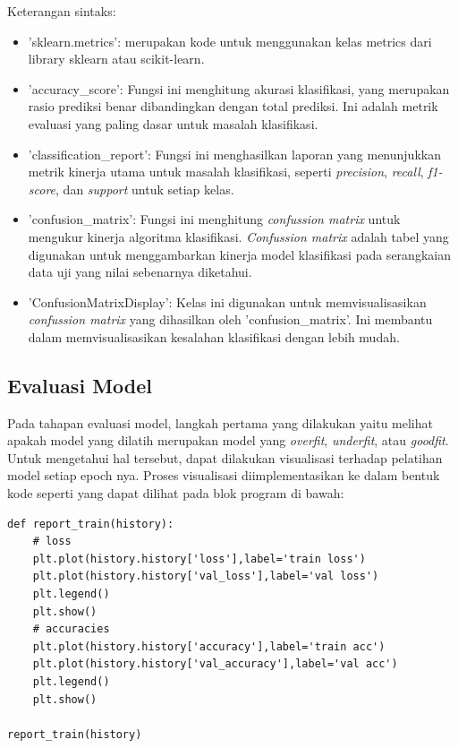Keterangan sintaks:
\begin{itemize}
    \item 'sklearn.metrics': merupakan kode untuk menggunakan kelas metrics dari library sklearn atau scikit-learn.
    \item 'accuracy\_score': Fungsi ini menghitung akurasi klasifikasi, yang merupakan rasio prediksi benar dibandingkan dengan total prediksi. Ini adalah metrik evaluasi yang paling dasar untuk masalah klasifikasi.
    \item 'classification\_report': Fungsi ini menghasilkan laporan yang menunjukkan metrik kinerja utama untuk masalah klasifikasi, seperti \textit{precision}, \textit{recall}, \textit{f1-score}, dan \textit{support} untuk setiap kelas.
    \item 'confusion\_matrix': Fungsi ini menghitung \textit{confussion matrix} untuk mengukur kinerja algoritma klasifikasi. \textit{Confussion matrix} adalah tabel yang digunakan untuk menggambarkan kinerja model klasifikasi pada serangkaian data uji yang nilai sebenarnya diketahui.
    \item 'ConfusionMatrixDisplay': Kelas ini digunakan untuk memvisualisasikan \textit{confussion matrix} yang dihasilkan oleh 'confusion\_matrix'. Ini membantu dalam memvisualisasikan kesalahan klasifikasi dengan lebih mudah.
\end{itemize}

\subsection{Evaluasi Model}
Pada tahapan evaluasi model, langkah pertama yang dilakukan yaitu melihat apakah model yang dilatih merupakan model yang \textit{overfit}, \textit{underfit}, atau \textit{goodfit}. Untuk mengetahui hal tersebut, dapat dilakukan visualisasi terhadap pelatihan model setiap epoch nya. Proses visualisasi diimplementasikan ke dalam bentuk kode seperti yang dapat dilihat pada blok program di bawah:

\begin{lstlisting}[style=customc]
def report_train(history):
    # loss
    plt.plot(history.history['loss'],label='train loss')
    plt.plot(history.history['val_loss'],label='val loss')
    plt.legend()
    plt.show()
    # accuracies
    plt.plot(history.history['accuracy'],label='train acc')
    plt.plot(history.history['val_accuracy'],label='val acc')
    plt.legend()
    plt.show()

report_train(history)
\end{lstlisting}

